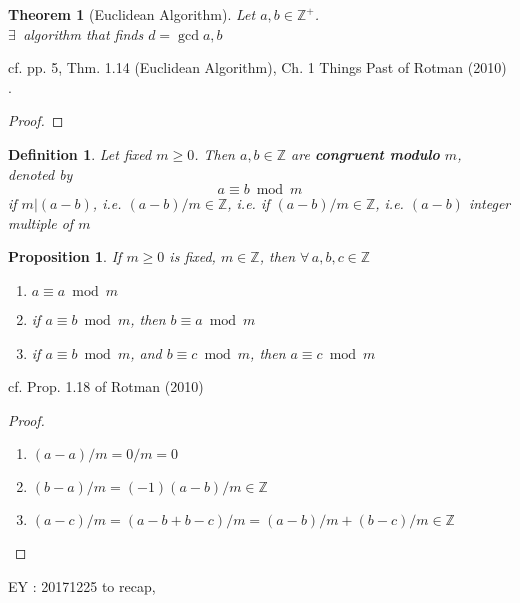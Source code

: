 \documentclass[10pt]{amsart}
\newtheorem{theorem}{Theorem}
\newtheorem{proposition}{Proposition}
\newtheorem{definition}{Definition}
\begin{document}
\begin{multicols*}{2}
\begin{theorem}[Euclidean Algorithm]
	Let $a,b \in \mathbb{Z}^+$.  \\
	$\exists \, $ algorithm that finds $d= \gcd{a,b}$
\end{theorem}

cf. pp. 5, Thm. 1.14 (Euclidean Algorithm), Ch. 1 Things Past of Rotman (2010) \cite{JRotman2010}.  

\begin{proof}
	\end{proof}

\begin{definition}
	Let fixed $m\geq 0$.  Then $a,b \in \mathbb{Z}$ are \textbf{congruent modulo } $m$, denoted by 
	\[
	a \equiv b \bmod{m} 
	\]
if $m|(a-b)$, i.e. $(a-b)/m \in \mathbb{Z}$, i.e. if $(a-b)/m\in\mathbb{Z}$, i.e. $(a-b)$ integer multiple of $m$
\end{definition}

\begin{proposition}
	If $m\geq 0$ is fixed, $m\in \mathbb{Z}$, then $\forall \, a,b,c \in \mathbb{Z}$
	\begin{enumerate}
		\item $a \equiv a\bmod{m}$ 
		\item if $a \equiv b\bmod{m}$, then $b \equiv a\bmod{m}$
		\item if $a \equiv b\bmod{m}$, and $b \equiv c\bmod{m}$, then $a \equiv c\bmod{m}$
	\end{enumerate}
\end{proposition}

cf. Prop. 1.18 of Rotman (2010) \cite{JRotman2010}

\begin{proof}
	\begin{enumerate}
		\item $(a-a)/m=0/m=0$
		\item $(b-a)/m=(-1)(a-b)/m \in \mathbb{Z}$
		\item $(a-c)/m=(a-b+b-c)/m=(a-b)/m+(b-c)/m\in\mathbb{Z}$  
	\end{enumerate}
\end{proof}

EY : 20171225 to recap, 


\end{multicols*}
\end{document}
